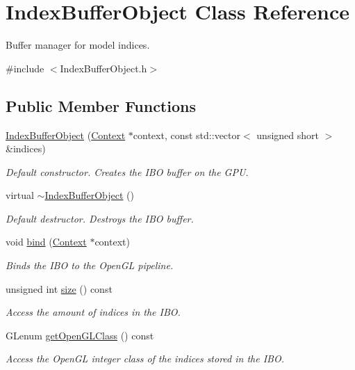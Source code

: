 \hypertarget{class_index_buffer_object}{}\section{Index\+Buffer\+Object Class Reference}
\label{class_index_buffer_object}


Buffer manager for model indices.  




{\ttfamily \#include $<$Index\+Buffer\+Object.\+h$>$}

\subsection*{Public Member Functions}
\begin{DoxyCompactItemize}
\item 
\hyperlink{class_index_buffer_object_af68b0d097152e2956479d931d553057f}{Index\+Buffer\+Object} (\hyperlink{class_context}{Context} $\ast$context, const std\+::vector$<$ unsigned short $>$ \&indices)
\begin{DoxyCompactList}\small\item\em Default constructor. Creates the I\+BO buffer on the G\+PU. \end{DoxyCompactList}\item 
virtual \hyperlink{class_index_buffer_object_ab90647bffb075f60071e404260881731}{$\sim$\+Index\+Buffer\+Object} ()
\begin{DoxyCompactList}\small\item\em Default destructor. Destroys the I\+BO buffer. \end{DoxyCompactList}\item 
void \hyperlink{class_index_buffer_object_aff2a0368134dec8cad54605d5435ba25}{bind} (\hyperlink{class_context}{Context} $\ast$context)
\begin{DoxyCompactList}\small\item\em Binds the I\+BO to the Open\+GL pipeline. \end{DoxyCompactList}\item 
unsigned int \hyperlink{class_index_buffer_object_a1d23270c5c1e3a39c48a98cb13abe80f}{size} () const 
\begin{DoxyCompactList}\small\item\em Access the amount of indices in the I\+BO. \end{DoxyCompactList}\item 
G\+Lenum \hyperlink{class_index_buffer_object_aa819995c955a645ca8db56fbdf3fcbbe}{get\+Open\+G\+L\+Class} () const 
\begin{DoxyCompactList}\small\item\em Access the Open\+GL integer class of the indices stored in the I\+BO. \end{DoxyCompactList}\end{DoxyCompactItemize}
